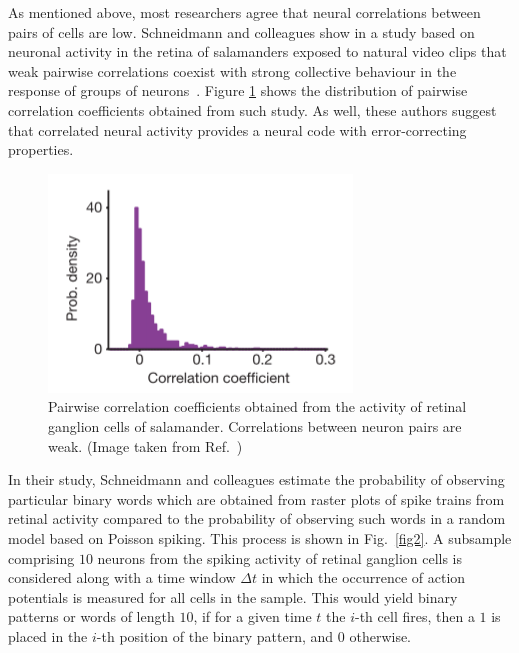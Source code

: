 \documentclass[11pt,letterpaper]{article}
\begin{document}
        As mentioned above, most researchers agree that neural correlations between
        pairs of cells are low.
        Schneidmann and colleagues show in a study
        based on neuronal activity in the retina of salamanders exposed to natural
        video clips that weak pairwise correlations
        coexist with strong collective behaviour in the response of groups
        of neurons~\cite{schneidman2006weak}. 
		Figure \ref{fig1} shows the distribution of pairwise correlation coefficients
		obtained from such study.
        As well, these authors suggest that correlated neural activity
        provides a neural code with error-correcting properties.

 		\begin{figure}[t]
			\centering
			\includegraphics[scale=0.75]{Schneidman3.png}
			\caption{
			    Pairwise correlation coefficients obtained from
			    the activity of retinal ganglion cells of salamander.
			    Correlations between neuron pairs are weak.
			    (Image taken from Ref.~\cite{schneidman2006weak})
			}
			\label{fig1}
		\end{figure} 
		
        In their study, Schneidmann and colleagues estimate the probability of
        observing particular binary words which are obtained from raster
        plots of spike trains from retinal activity compared to the
        probability of observing such words in a random model based on Poisson
        spiking.
        This process is shown in Fig.~\ref{fig2}.
        A subsample comprising $10$ neurons from the spiking activity of 
        retinal ganglion cells is considered along with a time window
        $\Delta t$ in which the occurrence of action potentials is
        measured for all cells in the sample.
        This would yield binary patterns or words of length $10$,
        if for a given time $t$ the $i$-th cell fires, then a $1$ is
        placed in the $i$-th position of the binary pattern, and $0$
        otherwise.
\end{document}
